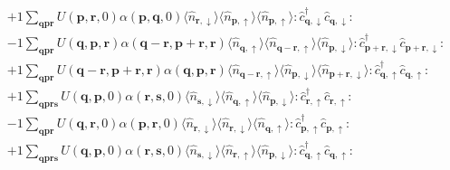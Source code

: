 \begin{align*}
	&+1 \sum_{ \mathbf{q} \mathbf{p} \mathbf{r} } U( \mathbf{p}, \mathbf{r}, 0 )  \alpha( \mathbf{p}, \mathbf{q}, 0 )   \langle \hat{n}_{ \mathbf{r}, \downarrow } \rangle \langle \hat{n}_{ \mathbf{p}, \uparrow } \rangle \langle \hat{n}_{ \mathbf{p}, \uparrow } \rangle :\hat{c}_{ \mathbf{q}, \downarrow }^\dagger \hat{c}_{ \mathbf{q}, \downarrow }^{\phantom{\dagger}}: \\
	&-1 \sum_{ \mathbf{q} \mathbf{p} \mathbf{r} } U( \mathbf{q}, \mathbf{p}, \mathbf{r} )  \alpha( \mathbf{q}-\mathbf{r}, \mathbf{p}+\mathbf{r}, \mathbf{r} )   \langle \hat{n}_{ \mathbf{q}, \uparrow } \rangle \langle \hat{n}_{ \mathbf{q}-\mathbf{r}, \uparrow } \rangle \langle \hat{n}_{ \mathbf{p}, \downarrow } \rangle :\hat{c}_{ \mathbf{p}+\mathbf{r}, \downarrow }^\dagger \hat{c}_{ \mathbf{p}+\mathbf{r}, \downarrow }^{\phantom{\dagger}}: \\
	&+1 \sum_{ \mathbf{q} \mathbf{p} \mathbf{r} } U( \mathbf{q}-\mathbf{r}, \mathbf{p}+\mathbf{r}, \mathbf{r} )  \alpha( \mathbf{q}, \mathbf{p}, \mathbf{r} )   \langle \hat{n}_{ \mathbf{q}-\mathbf{r}, \uparrow } \rangle \langle \hat{n}_{ \mathbf{p}, \downarrow } \rangle \langle \hat{n}_{ \mathbf{p}+\mathbf{r}, \downarrow } \rangle :\hat{c}_{ \mathbf{q}, \uparrow }^\dagger \hat{c}_{ \mathbf{q}, \uparrow }^{\phantom{\dagger}}: \\
	&+1 \sum_{ \mathbf{q} \mathbf{p} \mathbf{r} \mathbf{s} } U( \mathbf{q}, \mathbf{p}, 0 )  \alpha( \mathbf{r}, \mathbf{s}, 0 )   \langle \hat{n}_{ \mathbf{s}, \downarrow } \rangle \langle \hat{n}_{ \mathbf{q}, \uparrow } \rangle \langle \hat{n}_{ \mathbf{p}, \downarrow } \rangle :\hat{c}_{ \mathbf{r}, \uparrow }^\dagger \hat{c}_{ \mathbf{r}, \uparrow }^{\phantom{\dagger}}: \\
	&-1 \sum_{ \mathbf{q} \mathbf{p} \mathbf{r} } U( \mathbf{q}, \mathbf{r}, 0 )  \alpha( \mathbf{p}, \mathbf{r}, 0 )   \langle \hat{n}_{ \mathbf{r}, \downarrow } \rangle \langle \hat{n}_{ \mathbf{r}, \downarrow } \rangle \langle \hat{n}_{ \mathbf{q}, \uparrow } \rangle :\hat{c}_{ \mathbf{p}, \uparrow }^\dagger \hat{c}_{ \mathbf{p}, \uparrow }^{\phantom{\dagger}}: \\
	&+1 \sum_{ \mathbf{q} \mathbf{p} \mathbf{r} \mathbf{s} } U( \mathbf{q}, \mathbf{p}, 0 )  \alpha( \mathbf{r}, \mathbf{s}, 0 )   \langle \hat{n}_{ \mathbf{s}, \downarrow } \rangle \langle \hat{n}_{ \mathbf{r}, \uparrow } \rangle \langle \hat{n}_{ \mathbf{p}, \downarrow } \rangle :\hat{c}_{ \mathbf{q}, \uparrow }^\dagger \hat{c}_{ \mathbf{q}, \uparrow }^{\phantom{\dagger}}: \\

\end{align*}
